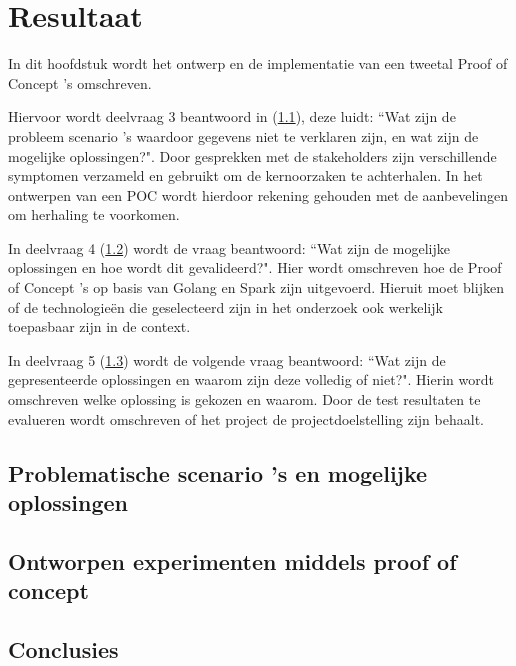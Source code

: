 \chapter{Resultaat}

In dit hoofdstuk wordt het ontwerp en de implementatie van een tweetal Proof of Concept 's omschreven.

Hiervoor wordt deelvraag 3 beantwoord in (\ref{sec:deelvraag3}), deze luidt: ``Wat zijn de probleem scenario 's waardoor gegevens niet te verklaren zijn, en wat zijn de mogelijke oplossingen?". Door gesprekken met de stakeholders zijn verschillende symptomen verzameld en gebruikt om de kernoorzaken te achterhalen. In het ontwerpen van een POC wordt hierdoor rekening gehouden met de aanbevelingen om herhaling te voorkomen.

In deelvraag 4 (\ref{sec:deelvraag4}) wordt de vraag beantwoord: ``Wat zijn de mogelijke oplossingen en hoe wordt dit gevalideerd?". Hier wordt omschreven hoe de Proof of Concept 's op basis van Golang en Spark zijn uitgevoerd. Hieruit moet blijken of de technologieën die geselecteerd zijn in het onderzoek ook werkelijk toepasbaar zijn in de context.

In deelvraag 5 (\ref{sec:deelvraag5}) wordt de volgende vraag beantwoord: ``Wat zijn de gepresenteerde oplossingen en waarom zijn deze volledig of niet?". Hierin wordt omschreven welke oplossing is gekozen en waarom. Door de test resultaten te evalueren wordt omschreven of het project de  projectdoelstelling zijn behaalt.

\clearpage

\section{Problematische scenario 's en mogelijke oplossingen}
\label{sec:deelvraag3}

\clearpage

\section{Ontworpen experimenten middels proof of concept}
\label{sec:deelvraag4}

\clearpage

\section{Conclusies}
\label{sec:deelvraag5}

